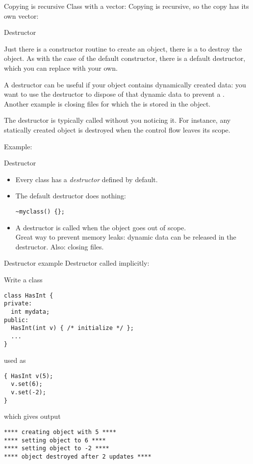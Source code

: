\begin{block}{Copying is recursive}
  \label{sl:class-copy-vector}
  Class with a vector:
  Copying is recursive, so the copy has its own vector:
\end{block}

 {Destructor}
\label{sec:destructor}

Just there is a constructor routine to create an object, there is a
 to destroy the object.
As with the case of the default constructor, there is a default
destructor, which you can replace with your own.

A destructor can be useful if your object contains dynamically created
data: you want to use the destructor to dispose of that dynamic data
to prevent a . Another example is closing
files for which the  is stored in the object.

The destructor is typically called without you noticing it. For
instance, any statically created object is destroyed when the control
flow leaves its scope.

Example:
%

\begin{slide}{Destructor}
  \label{sl:class-destruct}
  \begin{itemize}
  \item Every class  has a \emph{destructor} 
    defined by default.
  \item The default destructor does nothing:
\begin{lstlisting}
~myclass() {};
\end{lstlisting}
\item A destructor is called when the object goes out of scope.\\
  Great way to prevent memory leaks: dynamic data can be released
  in the destructor. Also: closing files.
\end{itemize}
\end{slide}

\begin{slide}{Destructor example}
  \label{sl:class-destruct-ex}
  Destructor called implicitly:
\end{slide}


\begin{exercise}
  \label{ex:destruct-trace}
  Write a class
\begin{lstlisting}
class HasInt {
private:
  int mydata;
public:
  HasInt(int v) { /* initialize */ };
  ...
}
\end{lstlisting}
used as
\begin{lstlisting}
{ HasInt v(5);
  v.set(6);
  v.set(-2);
}
\end{lstlisting}
which gives output
\begin{verbatim}
**** creating object with 5 ****
**** setting object to 6 ****
**** setting object to -2 ****
**** object destroyed after 2 updates ****
\end{verbatim}
\end{exercise}

